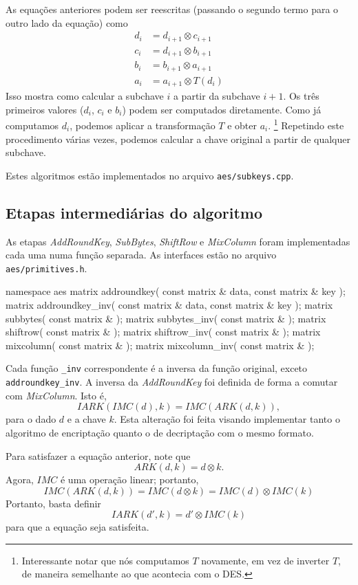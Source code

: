 \documentclass{article}
\newcommand{\xor}{\otimes}
\begin{document}
As equações anteriores podem ser reescritas
(passando o segundo termo para o outro lado da equação)
como
\begin{align*}
    d_i &= d_{i+1} \xor c_{i+1} \\
    c_i &= d_{i+1} \xor b_{i+1} \\
    b_i &= b_{i+1} \xor a_{i+1} \\
    a_i &= a_{i+1} \xor T(d_i)
\end{align*}
Isso mostra como calcular a subchave $i$ a partir da subchave $i+1$.
Os três primeiros valores ($d_i$, $c_i$ e $b_i$)
podem ser computados diretamente.
Como já computamos $d_i$, podemos aplicar a transformação $T$
e obter $a_i$.
\footnote{
    Interessante notar que nós computamos $T$ novamente,
    em vez de inverter $T$,
    de maneira semelhante ao que acontecia com o DES.
}
Repetindo este procedimento várias vezes,
podemos calcular a chave original a partir de qualquer subchave.

Estes algoritmos estão implementados no arquivo \verb"aes/subkeys.cpp".

\subsection{Etapas intermediárias do algoritmo}

As etapas \emph{AddRoundKey}, \emph{SubBytes}, \emph{ShiftRow} e \emph{MixColumn}
foram implementadas cada uma numa função separada.
As interfaces estão no arquivo \verb"aes/primitives.h".

\begin{cppcode}
    namespace aes {
        matrix addroundkey( const matrix & data, const matrix & key );
        matrix addroundkey_inv( const matrix & data, const matrix & key );
        matrix subbytes( const matrix & );
        matrix subbytes_inv( const matrix & );
        matrix shiftrow( const matrix & );
        matrix shiftrow_inv( const matrix & );
        matrix mixcolumn( const matrix & );
        matrix mixcolumn_inv( const matrix & );
    }
\end{cppcode}

Cada função \verb"_inv" correspondente é a inversa da função original,
exceto \verb"addroundkey_inv".
A inversa da \emph{AddRoundKey} foi definida
de forma a comutar com \emph{MixColumn}.
Isto é,
\begin{equation*}
    IARK( IMC(d), k ) = IMC( ARK(d, k) ),
\end{equation*}
para o dado $d$ e a chave $k$.
Esta alteração foi feita visando implementar tanto o algoritmo de encriptação
quanto o de decriptação com o mesmo formato.

Para satisfazer a equação anterior, note que
\begin{equation*}
    ARK( d, k ) = d \xor k.
\end{equation*}
Agora, $IMC$ é uma operação linear; portanto,
\begin{equation*}
    IMC( ARK(d, k) ) = IMC( d \xor k ) = IMC(d) \xor IMC(k)
\end{equation*}
Portanto, basta definir
\begin{equation*}
    IARK( d', k ) = d' \xor IMC(k)
\end{equation*}
para que a equação seja satisfeita.
\end{document}
